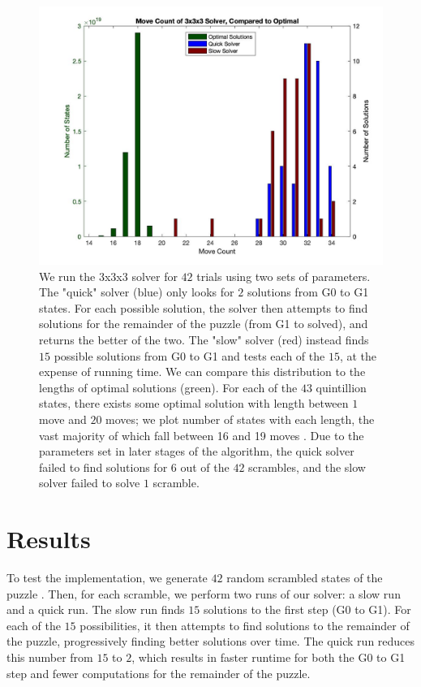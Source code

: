 \documentclass{article}
\begin{document}
\begin{figure}
	\centering
    \includegraphics[width=5in]{movecount.jpg}
	\caption{We run the 3x3x3 solver for $42$ trials using two sets of parameters. The "quick" solver (blue) only looks for $2$ solutions from G0 to G1 states. For each possible solution, the solver then attempts to find solutions for the remainder of the puzzle (from G1 to solved), and returns the better of the two. The "slow" solver (red) instead finds $15$ possible solutions from G0 to G1 and tests each of the $15$, at the expense of running time. We can compare this distribution to the lengths of optimal solutions (green). For each of the $43$ quintillion states, there exists some optimal solution with length between $1$ move and $20$ moves; we plot number of states with each length, the vast majority of which fall between 16 and 19 moves \cite{god}. Due to the parameters set in later stages of the algorithm, the quick solver failed to find solutions for $6$ out of the $42$ scrambles, and the slow solver failed to solve $1$ scramble.}
	\label{fig:movecount}
\end{figure}
\section{Results}

To test the implementation, we generate $42$ random scrambled states of the puzzle \cite{cstimer}. Then, for each scramble, we perform two runs of our solver: a slow run and a quick run. The slow run finds $15$ solutions to the first step (G0 to G1). For each of the $15$ possibilities, it then attempts to find solutions to the remainder of the puzzle, progressively finding better solutions over time. The quick run reduces this number from $15$ to $2$, which results in faster runtime for both the G0 to G1 step and fewer computations for the remainder of the puzzle.
\end{document}
